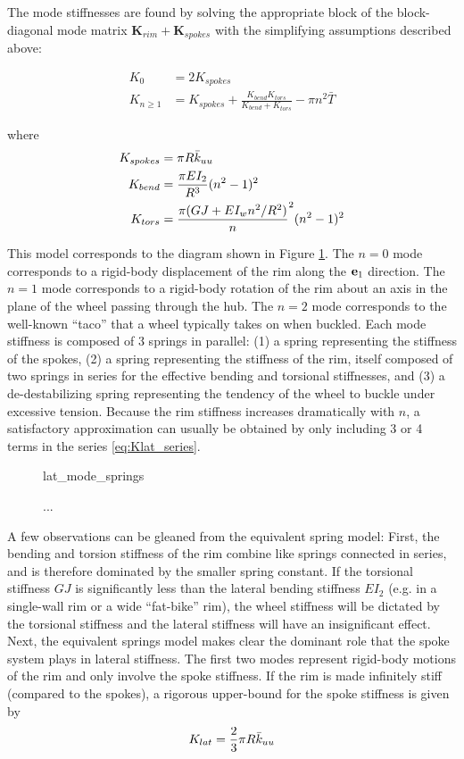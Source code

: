 \documentclass[\rootdir/thesis.tex]{subfiles}
\begin{document}
The mode stiffnesses are found by solving the appropriate block of the block-diagonal mode matrix $\mathbf{K}_{rim} + \mathbf{K}_{spokes}$ with the simplifying assumptions described above:

\begin{subequations}
\begin{align}
K_0 &= 2 K_{spokes}\\
K_{n\geq1} & = K_{spokes} + \frac{K_{bend}K_{tors}}{K_{bend} + K_{tors}} - \pi n^2 \bar{T}
\end{align}
\end{subequations}

where
\begin{align*}
K_{spokes} &= \pi R \bar{k}_{uu}\\
K_{bend} &= \frac{\pi EI_2}{R^3} (n^2-1)^2\\
K_{tors} &= \frac{\pi (GJ + EI_w n^2/R^2)}n^2(n^2-1)^2
\end{align*}

This model corresponds to the diagram shown in Figure \ref{fig:lat_mode_springs}. The $n=0$ mode corresponds to a rigid-body displacement of the rim along the $\mathbf{e}_1$ direction. The $n=1$ mode corresponds to a rigid-body rotation of the rim about an axis in the plane of the wheel passing through the hub. The $n=2$ mode corresponds to the well-known ``taco'' that a wheel typically takes on when buckled. Each mode stiffness is composed of 3 springs in parallel: (1) a spring representing the stiffness of the spokes, (2) a spring representing the stiffness of the rim, itself composed of two springs in series for the effective bending and torsional stiffnesses, and (3) a de-destabilizing spring representing the tendency of the wheel to buckle under excessive tension. Because the rim stiffness increases dramatically with $n$, a satisfactory approximation can usually be obtained by only including 3 or 4 terms in the series \eqref{eq:Klat_series}. 

\begin{figure}[h]
\centering
{lat_mode_springs}
\caption{...}
\label{fig:lat_mode_springs}
\end{figure}

A few observations can be gleaned from the equivalent spring model: First, the bending and torsion stiffness of the rim combine like springs connected in series, and is therefore dominated by the smaller spring constant. If the torsional stiffness $GJ$ is significantly less than the lateral bending stiffness $EI_2$ (e.g. in a single-wall rim or a wide ``fat-bike'' rim), the wheel stiffness will be dictated by the torsional stiffness and the lateral stiffness will have an insignificant effect. Next, the equivalent springs model makes clear the dominant role that the spoke system plays in lateral stiffness. The first two modes represent rigid-body motions of the rim and only involve the spoke stiffness. If the rim is made infinitely stiff (compared to the spokes), a rigorous upper-bound for the spoke stiffness is given by
\begin{equation}
\label{eq:Klat_stiff_rim}
K_{lat} = \frac{2}{3} \pi R \bar{k}_{uu}
\end{equation}
\end{document}
